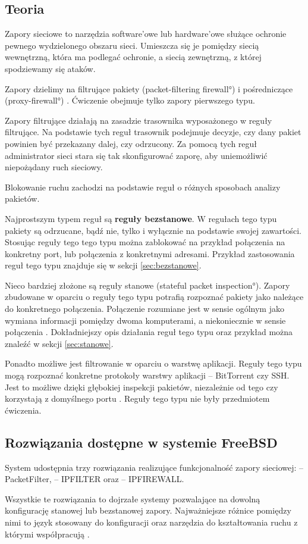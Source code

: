 \subsection{Teoria}

Zapory sieciowe to narzędzia software'owe lub hardware'owe służące ochronie
pewnego wydzielonego obszaru sieci. Umieszcza się je pomiędzy siecią wewnętrzną,
która ma podlegać ochronie, a siecią zewnętrzną, z której spodziewamy się ataków.

Zapory dzielimy na filtrujące pakiety (\ang{packet-filtering firewall}) i
pośredniczące (\ang{proxy-firewall}) \cite{wstep:stevens}. Ćwiczenie obejmuje
tylko zapory pierwszego typu.

Zapory filtrujące działają na zasadzie trasownika wyposażonego w reguły
filtrujące. Na podstawie tych reguł trasownik podejmuje decyzje, czy dany pakiet
powinien być przekazany dalej, czy odrzucony. Za pomocą tych reguł administrator
sieci stara się tak skonfigurować zaporę, aby uniemożliwić niepożądany ruch
sieciowy.

Blokowanie ruchu zachodzi na podstawie reguł o różnych sposobach analizy
pakietów.

Najprostszym typem reguł są \textbf{reguły bezstanowe}. W regułach tego typu
pakiety są odrzucane, bądź nie, tylko i wyłącznie na podstawie swojej
zawartości. Stosując reguły tego tego typu można zablokować na przykład
połączenia na konkretny port, lub połączenia z konkretnymi adresami. Przykład
zastosowania reguł tego typu znajduje się w sekcji \ref{sec:bezstanowe}.

Nieco bardziej złożone są reguły stanowe (\ang{stateful packet inspection}).
Zapory zbudowane w oparciu o reguły tego typu potrafią rozpoznać pakiety jako
należące do konkretnego połączenia. Połączenie rozumiane jest w sensie ogólnym
jako wymiana informacji pomiędzy dwoma komputerami, a niekoniecznie w sensie
połączenia \tcp. Dokładniejszy opis działania reguł tego typu oraz przykład
można znaleźć w sekcji \ref{sec:stanowe}.

Ponadto możliwe jest filtrowanie w oparciu o warstwę aplikacji. Reguły tego typu
mogą rozpoznać konkretne protokoły warstwy aplikacji -- BitTorrent czy SSH. Jest
to możliwe dzięki głębokiej inspekcji pakietów, niezależnie od tego czy
korzystają z domyślnego portu \cite{wstep:stevens}. Reguły tego typu nie były
przedmiotem ćwiczenia.


\subsection{Rozwiązania dostępne w systemie FreeBSD}

System \bsd{} udostępnia trzy rozwiązania realizujące funkcjonalność zapory
sieciowej: \pf{} -- PacketFilter, \ipf{} -- IPFILTER oraz \ipfw{} -- IPFIREWALL.

Wszystkie te rozwiązania to dojrzałe systemy pozwalające na dowolną konfigurację
stanowej lub bezstanowej zapory. Najważniejsze różnice pomiędzy nimi to język
stosowany do konfiguracji oraz narzędzia do kształtowania ruchu z którymi
współpracują \cite{bsd:firewalls}.
